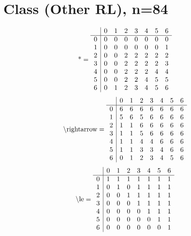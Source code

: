 \documentclass[11pt]{article}
\begin{document}
\section{Class (Other RL), n=84}
\[\text{*} = 
\begin{array}{r | r r r r r r r}
 & 0 & 1 & 2 & 3 & 4 & 5 & 6 \\ \hline
0 & 0 & 0 & 0 & 0 & 0 & 0 & 0 \\
1 & 0 & 0 & 0 & 0 & 0 & 0 & 1 \\
2 & 0 & 0 & 2 & 2 & 2 & 2 & 2 \\
3 & 0 & 0 & 2 & 2 & 2 & 2 & 3 \\
4 & 0 & 0 & 2 & 2 & 2 & 4 & 4 \\
5 & 0 & 0 & 2 & 2 & 4 & 5 & 5 \\
6 & 0 & 1 & 2 & 3 & 4 & 5 & 6 \\
\end{array}
\]
\[\text{\textbackslash rightarrow} = 
\begin{array}{r | r r r r r r r}
 & 0 & 1 & 2 & 3 & 4 & 5 & 6 \\ \hline
0 & 6 & 6 & 6 & 6 & 6 & 6 & 6 \\
1 & 5 & 6 & 5 & 6 & 6 & 6 & 6 \\
2 & 1 & 1 & 6 & 6 & 6 & 6 & 6 \\
3 & 1 & 1 & 5 & 6 & 6 & 6 & 6 \\
4 & 1 & 1 & 4 & 4 & 6 & 6 & 6 \\
5 & 1 & 1 & 3 & 3 & 4 & 6 & 6 \\
6 & 0 & 1 & 2 & 3 & 4 & 5 & 6 \\
\end{array}
\]
\[\text{\textbackslash le} = 
\begin{array}{r | r r r r r r r}
 & 0 & 1 & 2 & 3 & 4 & 5 & 6 \\ \hline
0 & 1 & 1 & 1 & 1 & 1 & 1 & 1 \\
1 & 0 & 1 & 0 & 1 & 1 & 1 & 1 \\
2 & 0 & 0 & 1 & 1 & 1 & 1 & 1 \\
3 & 0 & 0 & 0 & 1 & 1 & 1 & 1 \\
4 & 0 & 0 & 0 & 0 & 1 & 1 & 1 \\
5 & 0 & 0 & 0 & 0 & 0 & 1 & 1 \\
6 & 0 & 0 & 0 & 0 & 0 & 0 & 1 \\
\end{array}
\]
\end{document}
